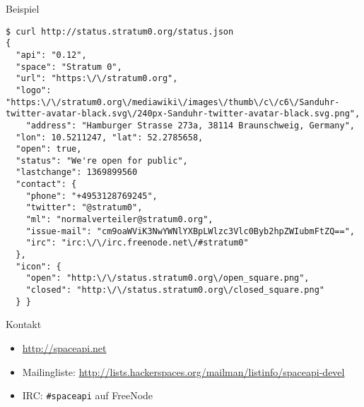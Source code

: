 \documentclass{beamer}
\begin{document}
\begin{frame}[fragile]{Beispiel}
\begin{lstlisting}
$ curl http://status.stratum0.org/status.json
{
  "api": "0.12",
  "space": "Stratum 0",
  "url": "https:\/\/stratum0.org",
  "logo": "https:\/\/stratum0.org\/mediawiki\/images\/thumb\/c\/c6\/Sanduhr-twitter-avatar-black.svg\/240px-Sanduhr-twitter-avatar-black.svg.png",
	"address": "Hamburger Strasse 273a, 38114 Braunschweig, Germany",
  "lon": 10.5211247, "lat": 52.2785658,
  "open": true,
  "status": "We're open for public",
  "lastchange": 1369899560
  "contact": {
    "phone": "+4953128769245",
    "twitter": "@stratum0",
    "ml": "normalverteiler@stratum0.org",
    "issue-mail": "cm9oaWViK3NwYWNlYXBpLWlzc3Vlc0Byb2hpZWIubmFtZQ==",
    "irc": "irc:\/\/irc.freenode.net\/#stratum0"
  },
  "icon": {
    "open": "http:\/\/status.stratum0.org\/open_square.png",
    "closed": "http:\/\/status.stratum0.org\/closed_square.png"
  } }
\end{lstlisting}
\end{frame}

\begin{frame}[fragile]{Kontakt}
\begin{itemize}
	\item \url{http://spaceapi.net}
	\item Mailingliste:
		\url{http://lists.hackerspaces.org/mailman/listinfo/spaceapi-devel}
	\item IRC: \texttt{\#spaceapi} auf FreeNode
\end{itemize}
\end{frame}
\end{document}
